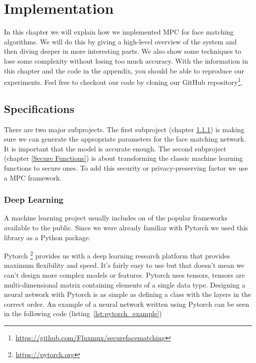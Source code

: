 

\DeclarePairedDelimiter\floor{\lfloor}{\rfloor}

\chapter{Implementation}
\label{chapter:implementation}
In this chapter we will explain how we implemented MPC for face matching algorithms. We will do this by giving a high-level overview of the system and then diving deeper in more interesting parts. We also show some techniques to lose some complexity without losing too much accuracy. With the information in this chapter and the code in the appendix, you should be able to reproduce our experiments. Feel free to checkout our code by cloning our GitHub repository\footnote{\url{https://github.com/Fluxmux/securefacematching}}.

\section{Specifications}
There are two major subprojects. The first subproject (chapter \ref{Deep Learning}) is making sure we can generate the appropriate parameters for the face matching network. It is important that the model is accurate enough. The second subproject (chapter \ref{Secure Functions}) is about transforming the classic machine learning functions to secure ones. To add this security or privacy-preserving factor we use a MPC framework.

\subsection{Deep Learning}
\label{Deep Learning}
A machine learning project usually includes on of the popular frameworks available to the public. Since we were already familiar with Pytorch we used this library as a Python package.

Pytorch \footnote{\url{https://pytorch.org}} provides us with a deep learning research platform that provides maximum flexibility and speed. It's fairly easy to use but that doesn't mean we can't design more complex models or features. Pytorch uses tensors, tensors are multi-dimensional matrix containing elements of a single data type. Designing a neural network with Pytorch is as simple as defining a class with the layers in the correct order. An example of a neural network written using Pytorch can be seen in the following code (listing~\ref{lst:pytorch_example})\\

